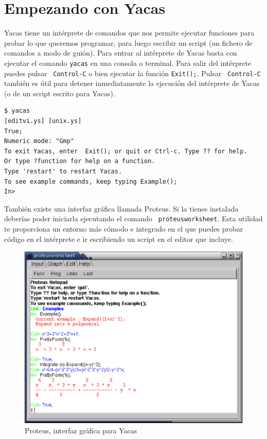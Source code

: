 \section{Empezando con Yacas}

Yacas  tiene  un  intérprete  de comandos  que  nos  permite  ejecutar
funciones para probar  lo que queremos programar,  para luego escribir
un script  (un fichero de  comandos a modo  de guión). Para  entrar al
intérprete de Yacas  basta con ejecutar el comando {\tt  yacas} en una
consola  o terminal.  Para  salir del  intérprete  puedes pulsar  {\tt
Control-C}  o bien  ejecutar la  función \verb+Exit();+.  Pulsar  {\tt
Control-C} también  es útil  para detener inmediatamente  la ejecución
del intérprete de Yacas (o de un script escrito para Yacas).

\begin{verbatim}
$ yacas
[editvi.ys] [unix.ys] 
True;
Numeric mode: "Gmp"
To exit Yacas, enter  Exit(); or quit or Ctrl-c. Type ?? for help.
Or type ?function for help on a function.
Type 'restart' to restart Yacas.
To see example commands, keep typing Example();
In>
\end{verbatim}

También  existe una  interfaz gráfica  llamada Proteus.  Si la  tienes
instalada  deberías   poder  iniciarla  ejecutando  el   comando  {\tt
proteusworksheet}. Esta utilidad te proporciona un entorno  más cómodo
e integrado  en el  que  puedes  probar código  en  el intérprete e ir
escribiendo un script en el editor que incluye.

\begin{figure}[hbt]
\centering\includegraphics[width=\textwidth]{imagenes/proteus.eps}
\caption{Proteus, interfaz gráfica para Yacas}
\end{figure}

